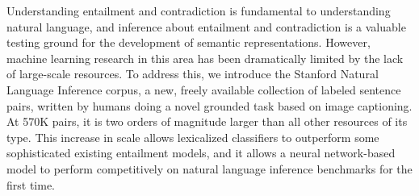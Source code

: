 Understanding entailment and contradiction is fundamental to understanding natural language, and inference about entailment and contradiction is a valuable testing ground for the development of semantic representations. However, machine learning research in this area has been dramatically limited by the lack of large-scale resources. To address this, we introduce the Stanford Natural Language Inference corpus, a new, freely available collection of labeled sentence pairs, written by humans doing a novel grounded task based on image captioning. At 570K pairs, it is two orders of magnitude larger than all other resources of its type. This increase in scale allows lexicalized classifiers to outperform some sophisticated existing entailment models, and it allows a neural network-based model to perform competitively on natural language inference benchmarks for the first time.
